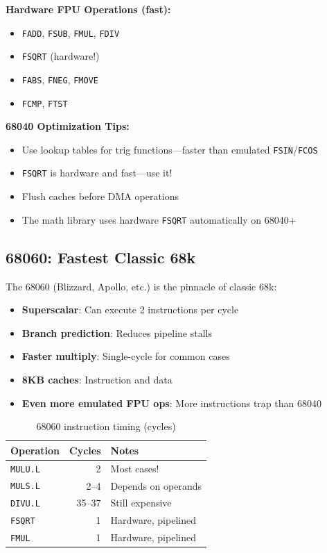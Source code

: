 \textbf{Hardware FPU Operations (fast):}
\begin{itemize}
\item \texttt{FADD}, \texttt{FSUB}, \texttt{FMUL}, \texttt{FDIV}
\item \texttt{FSQRT} (hardware!)
\item \texttt{FABS}, \texttt{FNEG}, \texttt{FMOVE}
\item \texttt{FCMP}, \texttt{FTST}
\end{itemize}

\textbf{68040 Optimization Tips:}
\begin{itemize}
\item Use lookup tables for trig functions---faster than emulated \texttt{FSIN}/\texttt{FCOS}
\item \texttt{FSQRT} is hardware and fast---use it!
\item Flush caches before DMA operations
\item The math library uses hardware \texttt{FSQRT} automatically on 68040+
\end{itemize}

\subsection{68060: Fastest Classic 68k}

The 68060 (Blizzard, Apollo, etc.) is the pinnacle of classic 68k:

\begin{itemize}
\item \textbf{Superscalar}: Can execute 2 instructions per cycle
\item \textbf{Branch prediction}: Reduces pipeline stalls
\item \textbf{Faster multiply}: Single-cycle for common cases
\item \textbf{8KB caches}: Instruction and data
\item \textbf{Even more emulated FPU ops}: More instructions trap than 68040
\end{itemize}

\begin{table}[h]
\centering
\begin{tabular}{lrl}
\textbf{Operation} & \textbf{Cycles} & \textbf{Notes} \\
\hline
\texttt{MULU.L} & 2 & Most cases! \\
\texttt{MULS.L} & 2--4 & Depends on operands \\
\texttt{DIVU.L} & 35--37 & Still expensive \\
\texttt{FSQRT} & 1 & Hardware, pipelined \\
\texttt{FMUL} & 1 & Hardware, pipelined \\
\end{tabular}
\caption{68060 instruction timing (cycles)}
\end{table}

